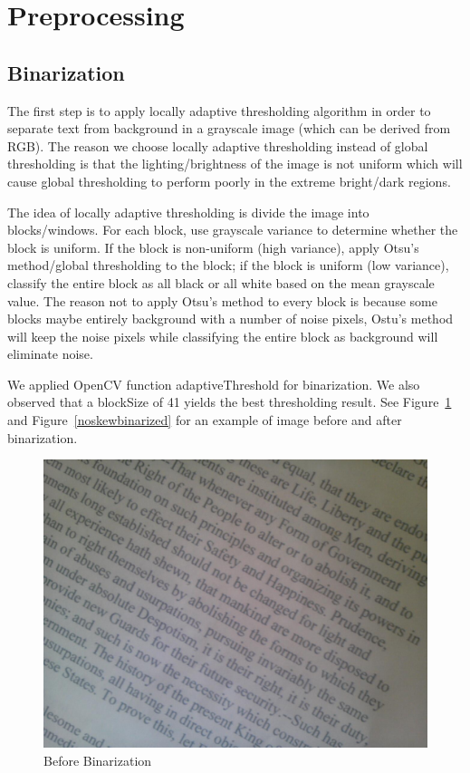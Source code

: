 \documentclass[conference]{IEEEtran}
\begin{document}
\section{Preprocessing}
\subsection{Binarization}

The first step is to apply locally adaptive thresholding algorithm in order to separate text from background in a grayscale image (which can be derived from RGB).  The reason we choose locally adaptive thresholding instead of global thresholding is that the lighting/brightness of the image is not uniform which will cause global thresholding to perform poorly in the extreme bright/dark regions.

The idea of locally adaptive thresholding is divide the image into blocks/windows.  For each block, use grayscale variance to determine whether the block is uniform.  If the block is non-uniform (high variance), apply Otsu's method/global thresholding to the block; if the block is uniform (low variance), classify the entire block as all black or all white based on the mean grayscale value.  The reason not to apply Otsu's method to every block is because some blocks maybe entirely background with a number of noise pixels, Ostu's method will keep the noise pixels while classifying the entire block as background will eliminate noise.

We applied OpenCV function adaptiveThreshold for binarization.  We also observed that a blockSize of 41 yields the best thresholding result.  See Figure~\ref{noskew} and Figure~\ref{noskewbinarized} for an example of image before and after binarization.

\begin{figure}
\center
\includegraphics[scale=0.15]{test261.jpg}
\caption{Before Binarization}
\label{noskew}
\end{figure}
\end{document}
